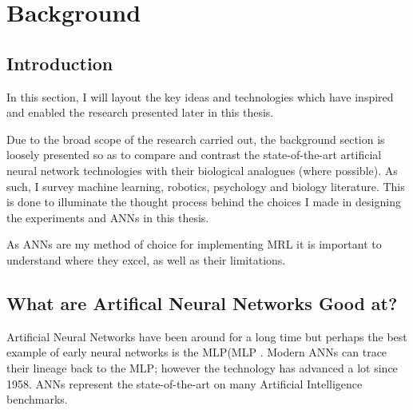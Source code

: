 
\chapter{Background} %

\label{Chapter3} %



\section{Introduction}\label{Lit:Intro}
In this section, I will layout the key ideas and technologies which have inspired and enabled the research presented later in this thesis.

Due to the broad scope of the research carried out, the background section is loosely presented so as to compare and contrast the state-of-the-art artificial neural network technologies with their biological analogues (where possible). As such, I survey machine learning, robotics, psychology and biology literature. This is done to illuminate the thought process behind the choices I made in designing the experiments and \acp{ANN} in this thesis.


As \acp{ANN} are my method of choice for implementing \ac{MRL} it is important to understand where they excel, as well as their limitations.

\section{What are Artifical Neural Networks Good at?}

Artificial Neural Networks have been around for a long time but perhaps the best example of early neural networks is the \acl{MLP}(\ac{MLP} \cite{rosenblatt1958perceptron}. Modern \acp{ANN} can trace their lineage back to the \ac{MLP}; however the technology has advanced a lot since 1958. \acp{ANN} represent the state-of-the-art on many Artificial Intelligence benchmarks.

